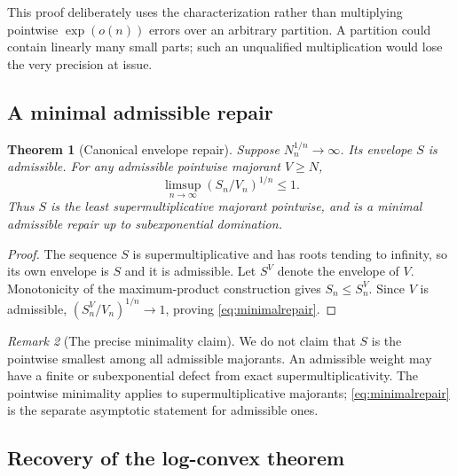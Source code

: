 \documentclass[11pt,a4paper]{article}
\numberwithin{equation}{section}
\newtheorem{theorem}{Theorem}[section]
\theoremstyle{definition}
\theoremstyle{remark}
\newtheorem{remark}[theorem]{Remark}
\begin{document}
This proof deliberately uses the characterization rather than multiplying
pointwise $\exp(o(n))$ errors over an arbitrary partition. A partition
could contain linearly many small parts; such an unqualified multiplication
would lose the very precision at issue.

\subsection{A minimal admissible repair}

\begin{theorem}[Canonical envelope repair]
\label{thm:repair}
Suppose $N_n^{1/n}\to\infty$. Its envelope $S$ is admissible.
For any admissible pointwise majorant $V\ge N$,
\begin{equation}
 \limsup_{n\to\infty}(S_n/V_n)^{1/n}\le1.
 \label{eq:minimalrepair}
\end{equation}
Thus $S$ is the least supermultiplicative majorant pointwise, and is a
minimal admissible repair up to subexponential domination.
\end{theorem}
\begin{proof}
The sequence $S$ is supermultiplicative and has roots tending to infinity,
so its own envelope is $S$ and it is admissible. Let $S^{V}$ denote the
envelope of $V$. Monotonicity of the maximum-product construction gives
$S_n\le S^{V}_n$. Since $V$ is admissible,
$(S^{V}_n/V_n)^{1/n}\to1$, proving \eqref{eq:minimalrepair}.
\end{proof}

\begin{remark}[The precise minimality claim]
We do not claim that $S$ is the pointwise smallest among all admissible
majorants. An admissible weight may have a finite or subexponential defect
from exact supermultiplicativity. The pointwise minimality applies to
supermultiplicative majorants; \eqref{eq:minimalrepair} is the separate
asymptotic statement for admissible ones.
\end{remark}

\subsection{Recovery of the log-convex theorem}
\end{document}
